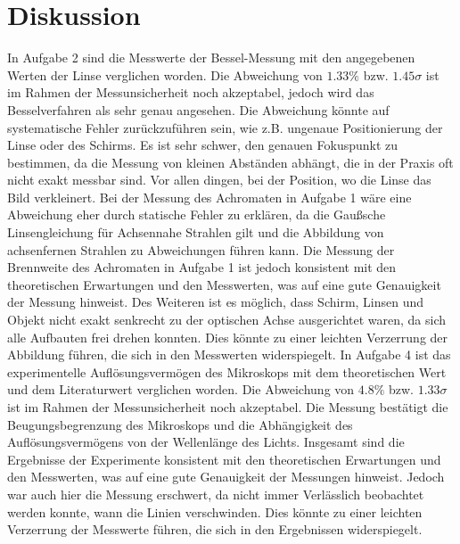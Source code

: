 \documentclass[12pt,a4paper,titlepage]{scrartcl}
\numberwithin{equation}{section}
\numberwithin{table}{section}
\numberwithin{figure}{section}
\begin{document}
\section{Diskussion}
In Aufgabe 2 sind die Messwerte der Bessel-Messung mit den angegebenen Werten der Linse verglichen worden. Die Abweichung von $1.33\%$ bzw. $1.45\sigma$ ist im Rahmen der Messunsicherheit noch akzeptabel, jedoch wird das Besselverfahren als sehr genau angesehen. Die Abweichung könnte auf systematische Fehler zurückzuführen sein, wie z.B. ungenaue Positionierung der Linse oder des Schirms. Es ist sehr schwer, den genauen Fokuspunkt zu bestimmen, da die Messung von kleinen Abständen abhängt, die in der Praxis oft nicht exakt messbar sind. Vor allen dingen, bei der Position, wo die Linse das Bild verkleinert. Bei der Messung des Achromaten in Aufgabe 1 wäre eine Abweichung eher durch statische Fehler zu erklären, da die Gaußsche Linsengleichung für Achsennahe Strahlen gilt und die Abbildung von achsenfernen Strahlen zu Abweichungen führen kann. Die Messung der Brennweite des Achromaten in Aufgabe 1 ist jedoch konsistent mit den theoretischen Erwartungen und den Messwerten, was auf eine gute Genauigkeit der Messung hinweist. Des Weiteren ist es möglich, dass Schirm, Linsen und Objekt nicht exakt senkrecht zu der optischen Achse ausgerichtet waren, da sich alle Aufbauten frei drehen konnten. Dies könnte zu einer leichten Verzerrung der Abbildung führen, die sich in den Messwerten widerspiegelt. In Aufgabe 4 ist das experimentelle Auflösungsvermögen des Mikroskops mit dem theoretischen Wert und dem Literaturwert verglichen worden. Die Abweichung von $4.8\%$ bzw. $1.33\sigma$ ist im Rahmen der Messunsicherheit noch akzeptabel. Die Messung bestätigt die Beugungsbegrenzung des Mikroskops und die Abhängigkeit des Auflösungsvermögens von der Wellenlänge des Lichts. Insgesamt sind die Ergebnisse der Experimente konsistent mit den theoretischen Erwartungen und den Messwerten, was auf eine gute Genauigkeit der Messungen hinweist. Jedoch war auch hier die Messung erschwert, da nicht immer Verlässlich beobachtet werden konnte, wann die Linien verschwinden. Dies könnte zu einer leichten Verzerrung der Messwerte führen, die sich in den Ergebnissen widerspiegelt.
\end{document}
